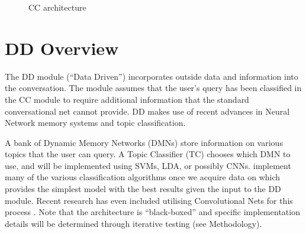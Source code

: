 \documentclass[10pt,twoside,twocolumn]{article}
\begin{document}
\begin{figure}[H]
    \centering
    
    \label{DD_design}
    \caption{CC architecture}
\end{figure}

\section{DD Overview}
The DD module (``Data Driven'') incorporates outside data and information into the conversation. The module assumes that the user's query has been classified in the CC module to require additional information that the standard conversational net cannot provide. DD makes use of recent advances in Neural Network memory systems and topic classification.

\noindent
A bank of Dynamic Memory Networks (DMNs) \cite{Kumar:2015, Xiong2016} store information on various topics that the user can query. A Topic Classifier (TC) chooses which DMN to use, and will be implemented using SVMs\cite{Joachims1998, Pilaszy2005}, LDA\cite{Blei2001, Zhao2011}, or possibly CNNs\cite{Kim2014}. implement many of the various classification algorithms once we acquire data on which provides the simplest model with the best results given the input to the DD module. Recent research has even included utilising Convolutional Nets for this process \cite{Kim2014}. Note that the architecture is ``black-boxed'' and specific implementation details will be determined through iterative testing (see Methodology).
\end{document}
